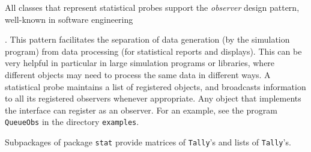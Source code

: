 All classes that represent statistical probes
support the \textit{observer} design pattern, well-known
in software engineering\begin{latexonly} \cite{iGAM98a}\end{latexonly}.
This pattern facilitates the separation of data generation (by the
simulation program) from data processing (for statistical reports and
displays).  This can be very helpful in particular in large simulation
programs or libraries, where different objects may need to process
the same data in different ways.
A statistical probe maintains a list of registered
objects, and broadcasts information to all its registered
observers whenever appropriate.  %
Any object that implements the interface
can register as an observer. For an example, see the program
\texttt{QueueObs} in the directory \texttt{examples}.

Subpackages of package \texttt{stat} provide matrices of \texttt{Tally}'s
and lists of \texttt{Tally}'s. %



\begin{comment}

When writing complex simulation programs, in data generation portions,
one uses the statistical
probes as usual but with observation notification turned on.  To turn
on observation notification, one simply calls
\externalmethod{umontreal.iro.lecuyer.stat}{StatProbe}{notifyObs}{}
on the probes.  In this mode, a probe becomes a \emph{distribution
  agency} which broadcasts received observations to
all \emph{observers} that registered to it.  It will also fulfill its
collector functionality unless it is disabled explicitly by calling
the
\externalmethod{umontreal.iro.lecuyer.stat}{StatProbe}{stopCollectStat}{}
method.
When the statistical collection is disabled, the probes are only
distribution agencies.

Data processing parts of the program are implemented through
observers. An observer is a class
implementing the \externalclass{java.util}{Observer} interface.  It
can be registered to any class extending
\externalclass{java.util}{Observable}, including
\externalclass{umontreal.iro.lecuyer.stat}{StatProbe}.
The observed value is passed
to the observers through the second argument of the
\externalmethod{java.util}{Observer}{update}{} method which is an
\texttt{Object}.  The argument must then be
type-casted to a \texttt{Double} wrapper object
before the observation value can be extracted.

\end{comment}
